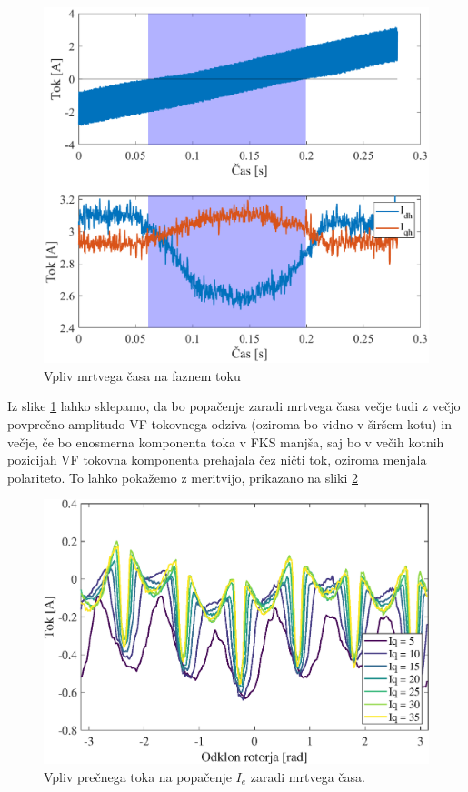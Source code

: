 \documentclass[a4paper,twoside,openright,12pt,slovene]{book}
\begin{document}
\begin{figure}[!htbp]
    \centering
    \includegraphics[width=0.95\columnwidth]{Slike/mrtviCasFazniTok.eps}
    \caption{\label{mrtviCasFazniTok} Vpliv mrtvega časa na faznem toku }
\end{figure}

Iz slike \ref{mrtviCasFazniTok} lahko sklepamo, da bo popačenje zaradi mrtvega časa večje tudi z večjo povprečno amplitudo VF tokovnega odziva (oziroma bo vidno v širšem kotu) in večje, če bo enosmerna
komponenta toka v FKS manjša, saj bo v večih kotnih pozicijah VF tokovna komponenta prehajala čez ničti tok, oziroma menjala polariteto. To lahko pokažemo z meritvijo, prikazano na sliki 
\ref{tokovniOdzivIs_HKSslediRKS_IdiffAmp_DT}

\begin{figure}[!htbp]
    \centering
    \includegraphics[width=0.75\columnwidth]{Slike/tokovniOdzivIs_HKSslediRKS_IdiffAmp_DT.eps}
    \caption{\label{tokovniOdzivIs_HKSslediRKS_IdiffAmp_DT} Vpliv prečnega toka na popačenje $I_e$ zaradi mrtvega časa. }
\end{figure}
\end{document}
